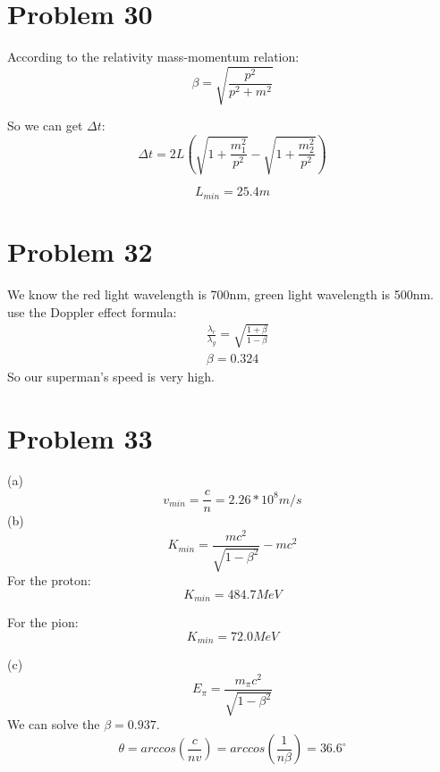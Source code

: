 \documentclass{article}
\begin{document}
\begin{CJK*}{GBK}{song}
\section{Problem 30}
According to the relativity mass-momentum relation:
\begin{equation}
\beta=\sqrt{\frac{p^2}{p^2+m^2}}
\end{equation}

So we can get $\Delta t$:
\begin{equation}
\Delta t=2L(\sqrt{1+\frac{m_1^2}{p^2}}-\sqrt{1+\frac{m_2^2}{p^2}})
\end{equation}

\begin{equation}
L_{min}=25.4m
\end{equation}



\section{Problem 32}
We know the red light wavelength is 700nm, green light wavelength is 500nm.\\
use the Doppler effect formula:
\begin{equation}
\begin{aligned}
&\frac{\lambda_{r}}{\lambda_{g}}=\sqrt{\frac{1+\beta}{1-\beta}}\\
&\beta=0.324
\end{aligned}
\end{equation}
So our superman's speed is very high.

\section{Problem 33}
(a)
\begin{equation}
v_{min}=\frac{c}{n}=2.26*10^8m/s
\end{equation}
(b)
\begin{equation}
K_{min}=\frac{mc^2}{\sqrt{1-\beta^2}}-mc^2
\end{equation}
For the proton:
\begin{equation}
K_{min}=484.7MeV
\end{equation}

For the pion:
\begin{equation}
K_{min}=72.0MeV
\end{equation}

(c)
\begin{equation}
E_{\pi}=\frac{m_{\pi}c^2}{\sqrt{1-\beta^2}}
\end{equation}
We can solve the $\beta=0.937$.
\begin{equation}
\theta=arccos(\frac{c}{nv})=arccos(\frac{1}{n\beta})=36.6^{\circ}
\end{equation}




\end{CJK*}
\end{document}
